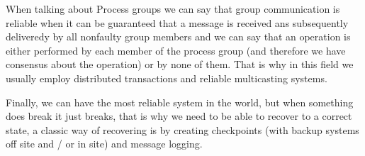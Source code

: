 When talking about Process groups we can say that group communication is reliable when it can be guaranteed that a message is received ans subsequently deliveredy by all nonfaulty group members and we can say that an operation is either performed by each member of the process group (and therefore we have consensus about the operation) or by none of them. That is why in this field we usually employ distributed transactions and reliable multicasting systems.

Finally, we can have the most reliable system in the world, but when something does break it just breaks, that is why we need to be able to recover to a correct state, a classic way of recovering is by creating checkpoints (with backup systems off site and / or in site) and message logging.